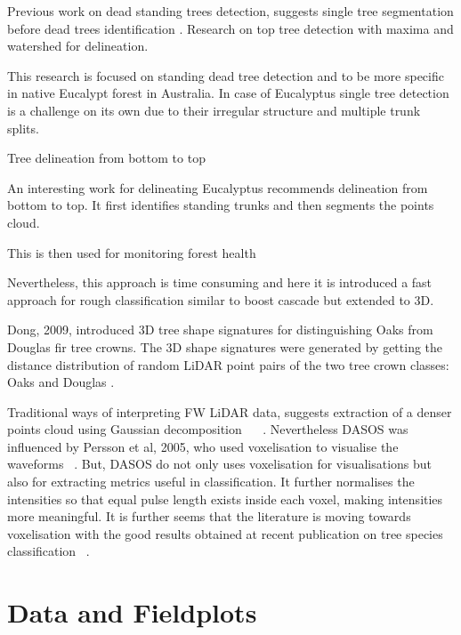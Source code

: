 \documentclass{subfiles}
\begin{document}
\par Previous work on dead standing trees detection, suggests single tree segmentation before dead trees identification \cite{Yao2012}.
Research on top tree detection with maxima and watershed for delineation. 



 \par This research is focused on standing dead tree detection and to be more specific in native Eucalypt forest in Australia. In case of Eucalyptus single tree detection is a challenge on its own due to their irregular structure and multiple trunk splits. 

Tree delineation from bottom to top \cite{Shendryk2016_treeDeliniation} 



An interesting work for delineating Eucalyptus recommends delineation from bottom to top. It first identifies standing trunks and then segments the points cloud. 

This is then used for monitoring forest health \cite{Shendryk2016_DeadTrees}



Nevertheless, this approach is time consuming and here it is introduced a fast approach for rough classification similar to boost cascade \cite{Viola2001} but extended to 3D. 

Dong, 2009, introduced 3D tree shape signatures for distinguishing Oaks from Douglas fir tree crowns. The 3D shape signatures were generated by getting the distance distribution of random LiDAR point pairs of the two tree crown classes: Oaks and Douglas \cite{Dong2009}. 



\par Traditional ways of interpreting FW LiDAR data, suggests extraction of a denser points cloud using Gaussian decomposition ~\cite{Neuenschwander2009} ~\cite{Reitberger2008}. Nevertheless DASOS was influenced by Persson et al, 2005, who used voxelisation to visualise the waveforms ~\cite{Persson2005}. But, DASOS do not only uses voxelisation for visualisations but also for extracting metrics useful in classification. It further normalises the intensities so that equal pulse length exists inside each voxel, making intensities more meaningful. It is further seems that the literature is moving towards voxelisation with the good results obtained at recent publication on tree species classification ~\cite{Cao2016}. 

\section{Data and Fieldplots}
\end{document}
